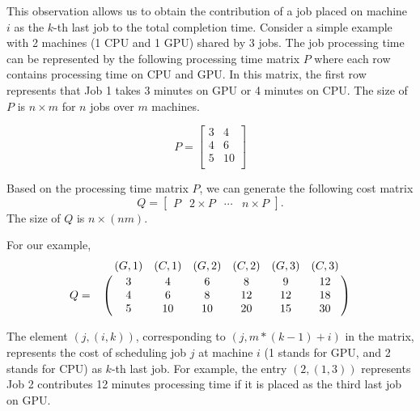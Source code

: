 

This observation allows us to obtain the contribution of a job placed on machine $i$ as the $k$-th last job to the total completion time. %
Consider a simple example with 2 machines (1 CPU and 1 GPU) shared by 3 jobs. The job processing time can be represented by the following processing time matrix $P$ where each row contains processing time on CPU and GPU. In this matrix, the first row represents that Job 1 takes 3 minutes on GPU or 4 minutes on CPU. The size of $P$ is $n\times m$ for $n$ jobs over $m$ machines.

$$
P = \begin{bmatrix}
3 & 4 \\
4 & 6 \\
5 & 10\\
\end{bmatrix}
$$

Based on the processing time matrix $P$, we can generate the following cost matrix $$Q = \begin{bmatrix}
P & 2\times P &\cdots& n\times P
\end{bmatrix}. $$
The size of $Q$ is $n\times (nm)$.

For our example, 
$$Q = \bordermatrix{
~ &(G,1) & (C,1) & (G,2) & (C,2) & (G,3) & (C,3) \cr
~& 3 & 4 & 6 & 8 & 9 & 12 \cr
~& 4 & 6 & 8 & 12 & 12 & 18 \cr
~& 5 & 10 & 10 & 20 & 15 & 30 \cr
}$$

The element $(j,(i,k))$, corresponding to $(j,m*(k-1)+i)$ in the matrix,  represents the cost of scheduling job $j$ at machine $i$ (1 stands for GPU, and 2 stands for CPU) as $k$-th last job. For example, the entry $(2, (1,3))$ represents Job 2 contributes 12 minutes processing time if it is placed as the third last job on GPU. %

